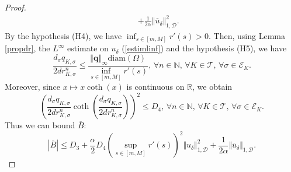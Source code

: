 \documentclass[smallextended]{svjour3}
\newcommand{\ds}{\displaystyle}
\begin{document}
\begin{proof}
\begin{eqnarray*}
& &+ \frac{1}{2\alpha}\Vert \overline{u}_{\delta}\Vert_{1,\mathcal{D}}^{2}. 
\end{eqnarray*}
By the hypothesis (H4), we have $\ds{\inf_{s \in [m,M]}r'(s)>0}$. Then, using Lemma \ref{propdr}, the $L^{\infty}$ estimate on $u_{\delta}$ (\ref{estimlinf}) and the hypothesis (H5), we have
\begin{equation*}
\frac{d_{\sigma}q_{K,\sigma}}{2dr^{n}_{K,\sigma}} \leq \frac{\Vert \textbf{q} \Vert_{\infty}\text{diam}(\Omega)}{\ds{\inf_{s\in [m,M]}r'(s)}}, \, \forall n \in \mathbb{N},\, \forall K \in \mathcal{T}, \, \forall \sigma \in \mathcal{E}_{K}. 
\end{equation*}
Moreover, since $x \mapsto x \coth(x)$ is continuous on $\mathbb{R}$, we obtain
\begin{equation*}
\left(\frac{d_{\sigma}q_{K,\sigma}}{2dr^{n}_{K,\sigma}}\coth\left(\frac{d_{\sigma}q_{K,\sigma}}{2dr^{n}_{K,\sigma}}\right)\right)^{2} \leq D_{4}, \, \forall n \in \mathbb{N},\, \forall K \in \mathcal{T}, \, \forall \sigma \in \mathcal{E}_{K}. 
\end{equation*}
Thus we can bound $ \overline{B}$:
\begin{equation}
\left\vert \overline{B} \right\vert \leq D_{3}+\frac{\alpha}{2}D_{4}\left(\sup_{s \in [m,M]}r'(s)\right)^{2}\Vert u_{\delta} \Vert_{1,\mathcal{D}}^{2}+\frac{1}{2\alpha}\Vert \overline{u}_{\delta} \Vert_{1,\mathcal{D}}.
\label{estimBb} 
\end{equation} 


\end{proof}
\end{document}
